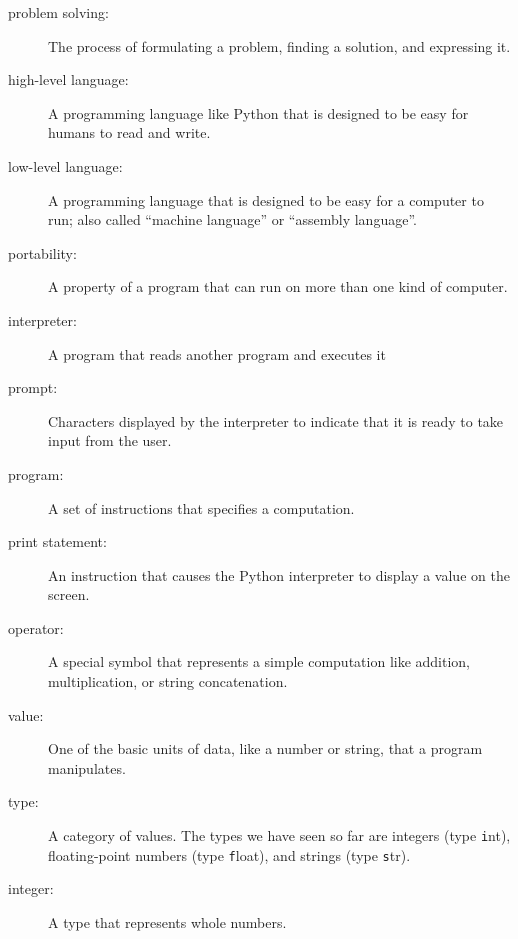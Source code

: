 \documentclass[
DIV=11,
fontsize=12,
twoside,
headinclude=false,
titlepage=firstiscover,
abstract=true,
headsepline=true,
footsepline=true,
chapterprefix=true, %
headings=big,
bibliography=totoc,%
captions=tableheading
]{scrbook}
\theoremstyle{definition}
\begin{document}
\begin{description}

\item[problem solving:]  The process of formulating a problem, finding
a solution, and expressing it.

\item[high-level language:]  A programming language like Python that
is designed to be easy for humans to read and write.

\item[low-level language:]  A programming language that is designed
to be easy for a computer to run; also called ``machine language'' or
``assembly language''.

\item[portability:]  A property of a program that can run on more
than one kind of computer.

\item[interpreter:]  A program that reads another program and executes
it

\item[prompt:] Characters displayed by the interpreter to indicate
that it is ready to take input from the user.

\item[program:] A set of instructions that specifies a computation.

\item[print statement:]  An instruction that causes the Python
interpreter to display a value on the screen.

\item[operator:]  A special symbol that represents a simple computation like
addition, multiplication, or string concatenation.

\item[value:]  One of the basic units of data, like a number or string, 
that a program manipulates.

\item[type:] A category of values.  The types we have seen so far
are integers (type {\texttt int}), floating-point numbers (type {\texttt
float}), and strings (type {\texttt str}).

\item[integer:] A type that represents whole numbers.


\end{description}
\end{document}
